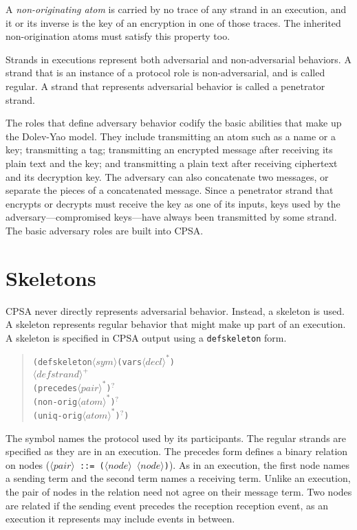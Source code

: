 \documentclass[12pt]{article}
\newcommand{\nterm}[1]{\ensuremath{\langle\mathit{#1}\rangle}}
\newcommand{\nterms}[1]{\ensuremath{\nterm{#1}^\ast}}
\newcommand{\ntermp}[1]{\ensuremath{\nterm{#1}^+}}
\newcommand{\ntermo}[1]{#1$^?$}
\begin{document}
A \emph{non-originating atom} is carried by no trace of any strand in
an execution, and it or its inverse is the key of an encryption in one
of those traces.  The inherited non-origination atoms must satisfy
this property too.

Strands in executions represent both adversarial and non-adversarial
behaviors.  A strand that is an instance of a protocol role is
non-adversarial, and is called regular.  A strand that represents
adversarial behavior is called a penetrator strand.

The roles that define adversary behavior codify the basic abilities
that make up the Dolev-Yao model.  They include transmitting an atom
such as a name or a key; transmitting a tag; transmitting an encrypted
message after receiving its plain text and the key; and transmitting a
plain text after receiving ciphertext and its decryption key.  The
adversary can also concatenate two messages, or separate the pieces of
a concatenated message.  Since a penetrator strand that encrypts or
decrypts must receive the key as one of its inputs, keys used by the
adversary---compromised keys---have always been transmitted by some
strand. The basic adversary roles are built into CPSA.

\section{Skeletons}

CPSA never directly represents adversarial behavior.  Instead, a
skeleton is used.  A skeleton represents regular behavior that might
make up part of an execution. A skeleton is specified in CPSA output using a
\texttt{defskeleton} form.
\begin{quote}
\begin{alltt}
(defskeleton \nterm{sym} (vars \nterms{decl})
\quad \ntermp{defstrand}
\quad \ntermo{(precedes \nterms{pair})}
\quad \ntermo{(non-orig \nterms{atom})}
\quad \ntermo{(uniq-orig \nterms{atom})})
\end{alltt}
\end{quote}
The symbol names the protocol used by its participants.  The regular
strands are specified as they are in an execution.  The precedes form
defines a binary relation on nodes (\texttt{\nterm{pair} ::=
  (\nterm{node} \nterm{node})}).  As in an execution, the first node
names a sending term and the second term names a receiving term.
Unlike an execution, the pair of nodes in the relation need not agree
on their message term.  Two nodes are related if the sending event
precedes the reception reception event, as an execution it represents
may include events in between.
\end{document}

